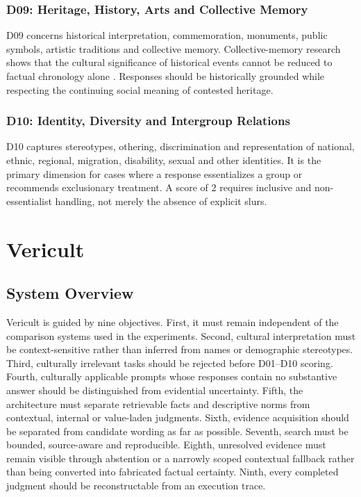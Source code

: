 \subsubsection{D09: Heritage, History, Arts and Collective Memory}

D09 concerns historical interpretation, commemoration, monuments, public symbols, artistic traditions and collective memory. Collective-memory research shows that the cultural significance of historical events cannot be reduced to factual chronology alone \parencite{assmann1995collective}. Responses should be historically grounded while respecting the continuing social meaning of contested heritage.

\subsubsection{D10: Identity, Diversity and Intergroup Relations}

D10 captures stereotypes, othering, discrimination and representation of national, ethnic, regional, migration, disability, sexual and other identities. It is the primary dimension for cases where a response essentializes a group or recommends exclusionary treatment. A score of 2 requires inclusive and non-essentialist handling, not merely the absence of explicit slurs.

\section{Vericult}

\subsection{System Overview}
Vericult is guided by nine objectives. First, it must remain independent of the comparison systems used in the experiments. Second, cultural interpretation must be context-sensitive rather than inferred from names or demographic stereotypes. Third, culturally irrelevant tasks should be rejected before D01--D10 scoring. Fourth, culturally applicable prompts whose responses contain no substantive answer should be distinguished from evidential uncertainty. Fifth, the architecture must separate retrievable facts and descriptive norms from contextual, internal or value-laden judgments. Sixth, evidence acquisition should be separated from candidate wording as far as possible. Seventh, search must be bounded, source-aware and reproducible. Eighth, unresolved evidence must remain visible through abstention or a narrowly scoped contextual fallback rather than being converted into fabricated factual certainty. Ninth, every completed judgment should be reconstructable from an execution trace.

